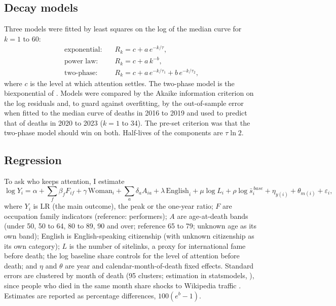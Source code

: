 \documentclass[11pt,a4paper]{article}
\begin{document}
\subsection{Decay models}
Three models were fitted by least squares on the log of the median curve for $k = 1$ to 60:
\begin{align*}
\text{exponential:}\quad & R_k = c + a\,e^{-k/\tau},\\
\text{power law:}\quad & R_k = c + a\,k^{-b},\\
\text{two-phase:}\quad & R_k = c + a\,e^{-k/\tau_1} + b\,e^{-k/\tau_2},
\end{align*}
where $c$ is the level at which attention settles. The two-phase model is the biexponential of \citet{candia2019}. Models were compared by the Akaike information criterion on the log residuals and, to guard against overfitting, by the out-of-sample error when fitted to the median curve of deaths in 2016 to 2019 and used to predict that of deaths in 2020 to 2023 ($k = 1$ to 34). The pre-set criterion was that the two-phase model should win on both. Half-lives of the components are $\tau \ln 2$.

\subsection{Regression}
To ask who keeps attention, I estimate
\begin{equation*}
\log Y_i = \alpha + \textstyle\sum_f \beta_f F_{if} + \gamma\,\text{Woman}_i + \textstyle\sum_a \delta_a A_{ia} + \lambda\,\text{English}_i + \mu \log L_i + \rho \log \bar s_i^{\,base} + \eta_{y(i)} + \theta_{m(i)} + \varepsilon_i,
\end{equation*}
where $Y_i$ is LR (the main outcome), the peak or the one-year ratio; $F$ are occupation family indicators (reference: performers); $A$ are age-at-death bands (under 50, 50 to 64, 80 to 89, 90 and over; reference 65 to 79; unknown age as its own band); English is English-speaking citizenship (with unknown citizenship as its own category); $L$ is the number of sitelinks, a proxy for international fame before death; the log baseline share controls for the level of attention before death; and $\eta$ and $\theta$ are year and calendar-month-of-death fixed effects. Standard errors are clustered by month of death (95 clusters; estimation in statsmodels, \citealp{seabold2010}), since people who died in the same month share shocks to Wikipedia traffic \citep{cameron2015,abadie2023}. Estimates are reported as percentage differences, $100(e^{b} - 1)$.
\end{document}
